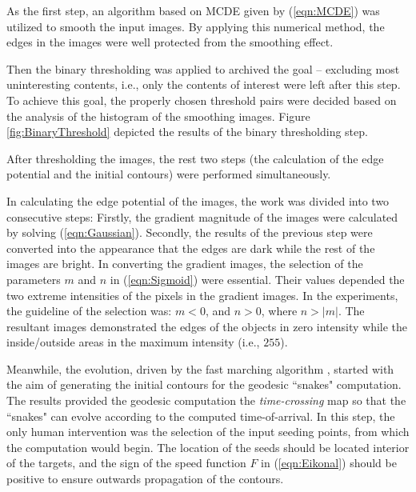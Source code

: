 As the first step, an algorithm based on MCDE given by (\ref{eqn:MCDE}) was utilized to smooth the input images.
By applying this numerical method, the edges in the images were well protected from the smoothing effect.

Then the binary thresholding was applied to archived the goal -- excluding most uninteresting contents, i.e., only the contents of interest were left after this step.
To achieve this goal, the properly chosen threshold pairs were decided based on the analysis of the histogram of the smoothing images.
Figure \ref{fig:BinaryThreshold} depicted the results of the binary thresholding step.

After thresholding the images, the rest two steps (the calculation of the edge potential and the initial contours) were performed simultaneously.

In calculating the edge potential of the images, the work was divided into two consecutive steps:
Firstly, the gradient magnitude of the images were calculated by solving (\ref{eqn:Gaussian}).
Secondly, the results of the previous step were converted into the appearance that the edges are dark while the rest of the images are bright.
In converting the gradient images, the selection of the parameters $m$ and $n$ in (\ref{eqn:Sigmoid}) were essential.
Their values depended the two extreme intensities of the pixels in the gradient images.
In the experiments, the guideline of the selection was: $m < 0$, and $n > 0$, where $n > |m|$.
The resultant images demonstrated the edges of the objects in zero intensity while the inside/outside areas in the maximum intensity (i.e., $255$).

Meanwhile, the evolution, driven by the fast marching algorithm \cite{Sethian1999}, started with the aim of generating the initial contours for the geodesic ``snakes" computation.
The results provided the geodesic computation the \emph{time-crossing} map so that the ``snakes" can evolve according to the computed time-of-arrival.
In this step, the only human intervention was the selection of the input seeding points, from which the computation would begin.
The location of the seeds should be located interior of the targets, and the sign of the speed function $F$ in (\ref{eqn:Eikonal}) should be positive to ensure outwards propagation of the contours. %

